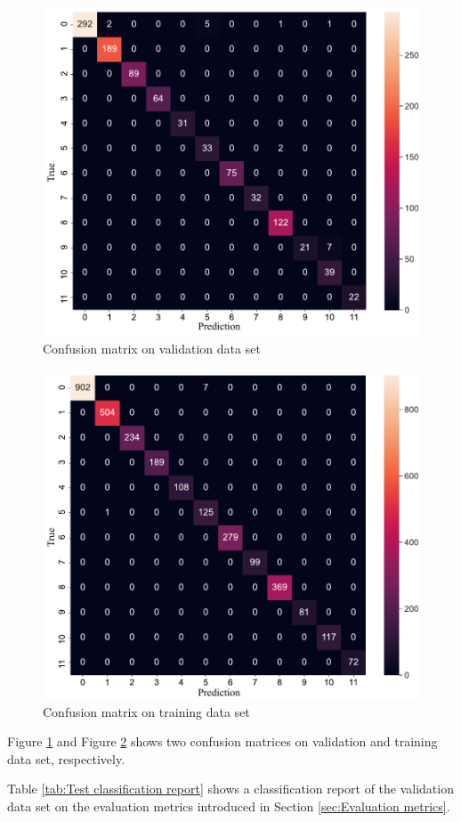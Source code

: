 \clearpage
\begin{figure}[H]
    \centering
    \includegraphics[width=.75\textwidth]{evaluation/imgs/5-confusion_matrix_val.pdf}
    \caption{Confusion matrix on validation data set}
    \label{fig:5-confusion_matrix_val}
\end{figure}
\begin{figure}[H]
    \centering
    \includegraphics[width=.75\textwidth]{evaluation/imgs/5-confusion_matrix_train.pdf}
    \caption{Confusion matrix on training data set}
    \label{fig:5-confusion_matrix_train}
\end{figure}

Figure \ref{fig:5-confusion_matrix_val} and Figure \ref{fig:5-confusion_matrix_train} shows two confusion matrices on validation and training data set, respectively.

Table \ref{tab:Test classification report} shows a classification report of the validation data set on the evaluation metrics introduced in Section \ref{sec:Evaluation metrics}.

